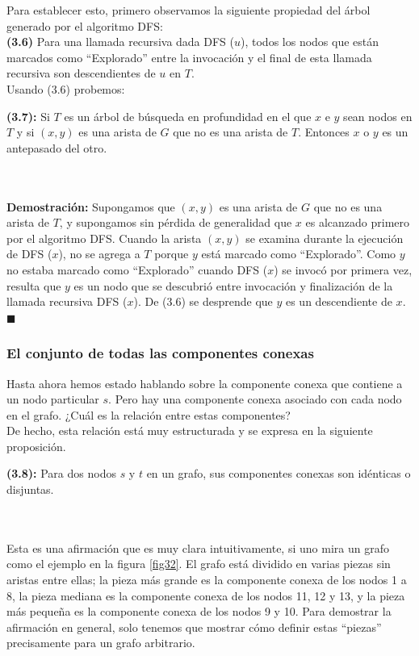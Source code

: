 \documentclass[a4paper, 12pt]{book}
\theoremstyle{dotless}
\begin{document}
Para establecer esto, primero observamos la siguiente propiedad del árbol generado por el algoritmo DFS:\\

 \textbf{(3.6)} Para una llamada recursiva dada DFS ($u$), todos los nodos que están marcados como ``Explorado'' entre la invocación y el final de esta llamada recursiva son descendientes de $u$ en $T$.\\

Usando (3.6) probemos:\\

 \colorbox{mygray}{\parbox{15cm}{
	\textbf{(3.7):} Si $T$ es un árbol de búsqueda en profundidad en el que $x$ e $y$ sean nodos en $T$ y si $(x, y)$ es una arista de $G$ que no es una arista de $T$. Entonces $x$ o $y$ es un antepasado del otro.}}\\\\
    
\textbf{Demostración:} Supongamos que $(x, y)$ es una arista de $G$ que no es una arista de $T$, y supongamos sin pérdida de generalidad que $x$ es alcanzado primero por el algoritmo DFS. Cuando la arista $(x, y)$ se examina durante la ejecución de DFS ($x$), no se agrega a $T$ porque $y$ está marcado como ``Explorado''. Como $y$ no estaba marcado como ``Explorado'' cuando DFS ($x$) se invocó por primera vez, resulta que $y$ es un nodo que se descubrió entre invocación y finalización de la llamada recursiva DFS ($x$). De (3.6) se desprende que $y$ es un descendiente de $x$. $ \blacksquare $

\subsubsection*{El conjunto de todas las componentes conexas} 

Hasta ahora hemos estado hablando sobre la componente conexa que contiene a un
nodo particular $s$. Pero hay una componente conexa asociado con cada
nodo en el grafo. ¿Cuál es la relación entre estas componentes?\\

De hecho, esta relación está muy estructurada y se expresa en la siguiente proposición.\\

 \colorbox{mygray}{\parbox{15cm}{
	\textbf{(3.8):} Para dos nodos $s$ y $t$ en un grafo, sus componentes conexas son
idénticas o disjuntas.}}\\\\

Esta es una afirmación que es muy clara intuitivamente, si uno mira un grafo como
el ejemplo en la figura \ref{fig32}. El grafo está dividido en varias piezas sin
aristas entre ellas; la pieza más grande es la componente conexa de los nodos
1 a 8, la pieza mediana es la componente conexa de los nodos 11, 12 y 13, y la pieza más pequeña es la componente conexa de los nodos 9 y 10. Para demostrar la afirmación en general, solo tenemos que mostrar cómo definir estas ``piezas'' precisamente para un grafo arbitrario.\\
\end{document}
